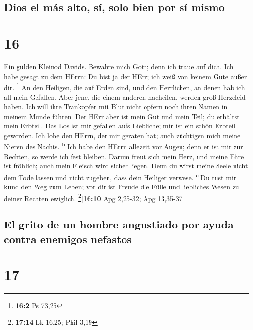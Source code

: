 \hypertarget{dios-el-muxe1s-alto-suxed-solo-bien-por-suxed-mismo}{%
\subsection{Dios el más alto, sí, solo bien por sí
mismo}\label{dios-el-muxe1s-alto-suxed-solo-bien-por-suxed-mismo}}

\hypertarget{section-15}{%
\section{16}\label{section-15}}

 Ein gülden Kleinod Davids. Bewahre mich Gott; denn ich
traue auf dich.  Ich habe gesagt zu dem HErrn: Du bist ja
der HErr; ich weiß von keinem Gute außer dir. \footnote{\textbf{16:2} Ps
  73,25}  An den Heiligen, die auf Erden sind, und den
Herrlichen, an denen hab ich all mein Gefallen.  Aber
jene, die einem anderen nacheilen, werden groß Herzeleid haben. Ich will
ihre Trankopfer mit Blut nicht opfern noch ihren Namen in meinem Munde
führen.  Der HErr aber ist mein Gut und mein Teil; du
erhältst mein Erbteil.  Das Los ist mir gefallen aufs
Liebliche; mir ist ein schön Erbteil geworden.  Ich lobe
den HErrn, der mir geraten hat; auch züchtigen mich meine Nieren des
Nachts. \textsuperscript{b}  Ich habe den HErrn allezeit
vor Augen; denn er ist mir zur Rechten, so werde ich fest bleiben.
 Darum freut sich mein Herz, und meine Ehre ist fröhlich;
auch mein Fleisch wird sicher liegen.  Denn du wirst
meine Seele nicht dem Tode lassen und nicht zugeben, dass dein Heiliger
verwese. \textsuperscript{c}  Du tust mir kund den Weg
zum Leben; vor dir ist Freude die Fülle und liebliches Wesen zu deiner
Rechten ewiglich. \footnote{\textbf{17:14} Lk 16,25; Phil 3,19}{[}\textbf{16:10}
Apg 2,25-32; Apg 13,35-37{]}

\hypertarget{el-grito-de-un-hombre-angustiado-por-ayuda-contra-enemigos-nefastos}{%
\subsection{El grito de un hombre angustiado por ayuda contra enemigos
nefastos}\label{el-grito-de-un-hombre-angustiado-por-ayuda-contra-enemigos-nefastos}}

\hypertarget{section-16}{%
\section{17}\label{section-16}}

